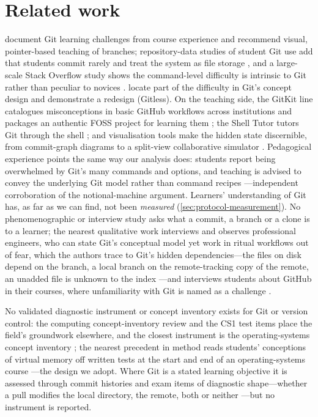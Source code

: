 \mode*
\section{Related work}
\label{sec:related}

\Textcite{IsomottonenCochez2014} document Git learning challenges from
course experience and recommend visual, pointer-based teaching of
branches; repository-data studies of student Git use add that students
commit rarely and treat the system as file storage
\autocite{Cochez2013DVCSUsage}, and a large-scale Stack Overflow study
shows the command-level difficulty is intrinsic to Git rather than peculiar
to novices \autocite{Yang2022GitCommands}.
\Textcite{DeRossoJackson2016Gitless} locate part of the difficulty in Git's
concept design and demonstrate a redesign (Gitless).
On the teaching side, the GitKit line catalogues misconceptions in basic
GitHub workflows across institutions and packages an authentic FOSS project
for learning them
\autocite{Postner2026GitMisconceptions,Braught2024GitKit};
the Shell Tutor tutors Git through the shell \autocite{Winder2024ShellTutor};
and visualisation tools make the hidden state discernible, from commit-graph
diagrams to a split-view collaborative simulator
\autocite{Bucher2026GitTakesTwo}.
Pedagogical experience points the same way our analysis does: students
report being overwhelmed by Git's many commands and options, and teaching
is advised to convey the underlying Git model rather than command recipes
\autocite{Wagner2025RethinkGit}---independent corroboration of the
notional-machine argument.
Learners' understanding of Git has, as far as we can find, not been
\emph{measured} (\cref{sec:protocol-measurement}).
No phenomenographic or interview study asks what a commit, a branch or a
clone is to a learner; the nearest qualitative work interviews and
observes professional engineers, who can state Git's conceptual model
yet work in ritual workflows out of fear, which the authors trace to
Git's hidden dependencies---the files on disk depend on the branch, a
local branch on the remote-tracking copy of the remote, an unadded file
is unknown to the index \autocite{Church2014HiddenDependencies}---and
interviews students about GitHub in their courses, where unfamiliarity
with Git is named as a challenge \autocite{Feliciano2016GitHubStudents}.

No validated diagnostic instrument or concept inventory exists for Git
or version control: the computing concept-inventory review
\autocite{Taylor2014CI} and the CS1 test items
\autocite{Vahrenhold2014TestItems} place the field's groundwork
elsewhere, and the closest instrument is the operating-systems concept
inventory \autocite{WebbTaylor2014OSCI}; the nearest precedent in method
reads students' conceptions of virtual memory off written tests at the
start and end of an operating-systems course
\autocite{Pamplona2024VirtualMemory}---the design we adopt.
Where Git is a stated learning objective it is assessed through commit
histories and exam items of diagnostic shape---whether a pull modifies
the local directory, the remote, both or neither
\autocite{Beckman2021GitLearningObjective}---but no instrument is
reported.

